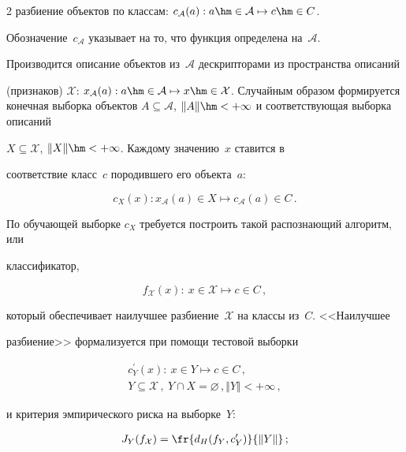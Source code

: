\begin{multicols}{2}
разбиение объектов по классам: $c_{\mathcal{A}}(a): a\hm\in\mathcal{A}\mapsto c\hm\in C$. 

Обозначение~$c_{\mathcal{A}}$ указывает на то, что функция определена на~$\mathcal{A}$.



Производится описание объектов из~$\mathcal{A}$ дескрипторами из пространства описаний 

(признаков) $\mathcal{X}$: $x_{\mathcal{A}}(a): a\hm\in\mathcal{A}\mapsto 

x\hm\in\mathcal{X}$. Случайным образом формируется конечная выборка объектов $A\subseteq 

\mathcal{A}$, $\Vert A\Vert \hm<+\infty$ и соответствующая выборка описаний 

$X\subseteq\mathcal{X}$, $\Vert X\Vert\hm<+\infty$. Каждому значению~$x$ ставится в 

соответствие класс~$c$ породившего его объекта~$a$:

$$

   c_X(x): x_{\mathcal{A}}(a)\in X\mapsto c_{\mathcal{A}}(a)\in C\,.

   $$

По обучающей выборке $c_X$ требуется построить такой распознающий алгоритм, или 

классификатор,

$$

f_{\mathcal{X}}(x):\ x\in\mathcal{X}\mapsto c\in C\,,

$$ 

который обеспечивает наилучшее разбиение~$\mathcal{X}$ на классы из~$C$. <<Наилучшее 

разбиение>> формализуется при помощи тестовой выборки

\begin{gather*}

c^\prime_Y(x):\ x\in Y\mapsto c\in C\,,\\

Y\subseteq \mathcal{X}\,,\ Y\cap X=\varnothing\,, \Vert 

Y\Vert <+\infty\,,

\end{gather*}

и критерия эмпирического риска на выборке~$Y$:

\begin{align*}

J_Y(f_{\mathcal{X}}) &= \fr{d_H(f_Y, c^\prime_Y)}{\Vert Y\Vert}\,;\\


\end{align*}
\end{multicols}
